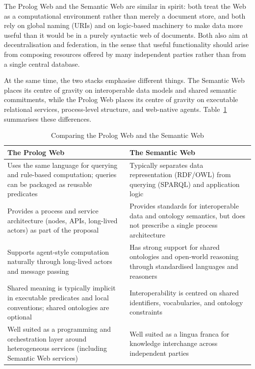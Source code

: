\noindent The Prolog Web and the Semantic Web are similar in spirit: both treat the Web as a computational environment rather than merely a document store, and both rely on global naming (URIs) and on logic-based machinery to make data more useful than it would be in a purely syntactic web of documents. Both also aim at decentralisation and federation, in the sense that useful functionality should arise from composing resources offered by many independent parties rather than from a single central database.

At the same time, the two stacks emphasise different things. The Semantic Web places its centre of gravity on interoperable data models and shared semantic commitments, while the Prolog Web places its centre of gravity on executable relational services, process-level structure, and web-native agents. Table~\ref{fig:wp-sw-comparison} summarises these differences.


\begin{table}[h]
\begin{center}
\begin{tabular}{ | p{5.7cm} | p{5.7cm} | }
\hline
\textbf{The Prolog Web} & \textbf{The Semantic Web} \\ \hline
Uses the same language for querying and rule-based computation; queries can be packaged as reusable predicates & Typically separates data representation (RDF/OWL) from querying (SPARQL) and application logic \\ \hline
Provides a process and service architecture (nodes, APIs, long-lived actors) as part of the proposal & Provides standards for interoperable data and ontology semantics, but does not prescribe a single process architecture \\ \hline
Supports agent-style computation naturally through long-lived actors and message passing & Has strong support for shared ontologies and open-world reasoning through standardised languages and reasoners \\ \hline
Shared meaning is typically implicit in executable predicates and local conventions; shared ontologies are optional & Interoperability is centred on shared identifiers, vocabularies, and ontology constraints \\ \hline
Well suited as a programming and orchestration layer around heterogeneous services (including Semantic Web services) & Well suited as a lingua franca for knowledge interchange across independent parties \\ \hline
\end{tabular}
\end{center}
\caption{Comparing the Prolog Web and the Semantic Web}
\label{fig:wp-sw-comparison}
\end{table}




